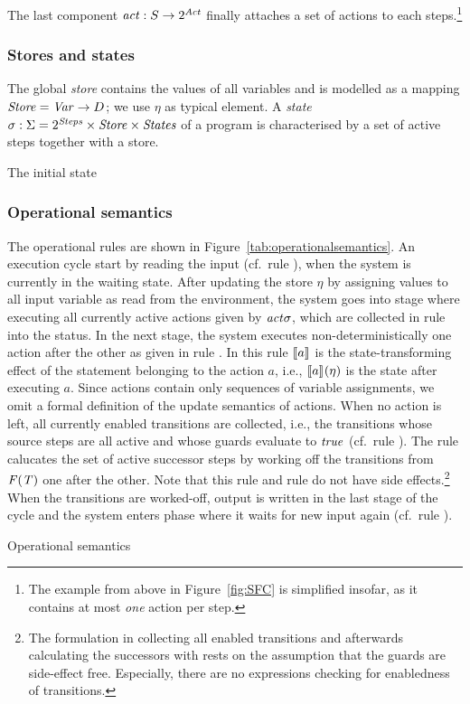  The last component $\mathit{act} \mathrel{:} S \to
2^{\mathit{Act}}$ finally attaches a set of actions to each steps.\footnote{The
  example from above in Figure~\ref{fig:SFC} is simplified insofar, as it
  contains at most \emph{one} action per step.}


\subsubsection{Stores and states}





The global \emph{store} contains the values of all variables and is
modelled as a mapping $\mathit{Store} = \mathit{Var} \to D$; we use $\eta$ as typical
element. A \emph{state} $\sigma \mathrel{:} \Sigma = 2^{\mathit{Steps}} \times \mathit{Store} \times
\mathit{States}$ of a program is characterised by a set of active steps together
with a store.

The initial state



\subsubsection{Operational semantics}


The operational rules are shown in Figure~\ref{tab:operationalsemantics}.
An execution cycle start by reading the input (cf.\ rule ), when
the system is currently in the waiting state. After updating the store
$\eta$ by assigning values to all input variable as read from the
environment, the system goes into stage where executing all currently
active actions given by $\mathit{act}{\sigma}$, which are collected in rule
 into the status. In the next stage, the system executes
non-deterministically one action after the other as given in rule .
In this rule $[\![a]\!]_{}$ is the state-transforming effect of the statement
belonging to the action $a$, i.e., $[\![a]\!]_{}(\eta)$ is the state after
executing $a$. Since actions contain only sequences of variable
assignments, we omit a formal definition of the update semantics of
actions. When no action is left, all currently enabled transitions are
collected, i.e., the transitions whose source steps are all active and
whose guards evaluate to $\mathit{true}$ (cf.\ rule ). The rule
 calucates the set of active successor steps by working off
the transitions from $\mathit{F(T)}$ one after the other. Note that this
rule and rule  do not have side effects.\footnote{The
  formulation in  collecting all enabled transitions and
  afterwards calculating the successors with  rests on the
  assumption that the guards are side-effect free. Especially, there are
  no expressions checking for enabledness of transitions.} When the
transitions are worked-off, output is written in the last stage of the
cycle and the system enters phase where it waits for new input again (cf.\ 
rule ).


\begin{table}[htbp]
  \begin{ruleset}
      
  \end{ruleset}
  \caption{Operational semantics}
  \label{tab:operationalsemantics}
\end{table}








